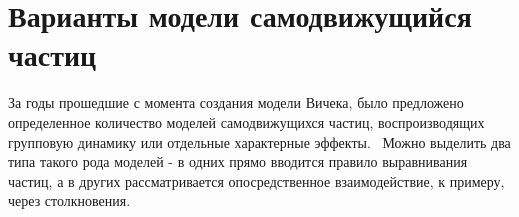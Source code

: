 \section{Варианты модели самодвижущийся частиц} %
\label{sec:VariantsOfVicsekModel}
    За годы прошедшие с момента создания модели Вичека, было предложено определенное количество моделей самодвижущихся частиц, воспроизводящих групповую динамику или отдельные характерные эффекты.~\cite{vicsek2012}
    Можно выделить два типа такого рода моделей - в одних прямо вводится правило выравнивания частиц, а в других рассматривается опосредственное взаимодействие, к примеру, через столкновения.

